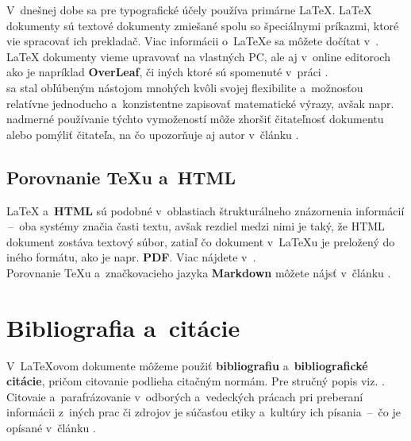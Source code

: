 \documentclass[a4paper, 11pt]{article}
\begin{document}
  \noindent V~dnešnej dobe sa pre typografické účely používa primárne {\LaTeX}. {\LaTeX} dokumenty sú textové dokumenty zmiešané spolu so špeciálnymi príkazmi, ktoré vie spracovať ich prekladač. Viac informácii o~{\LaTeX}e sa môžete dočítat v~\cite{rybicka2003latex}. {\LaTeX} dokumenty vieme upravovať na vlastných PC, ale aj v~online editoroch ako je napríklad \textbf{OverLeaf}, či iných ktoré sú spomenuté v~práci \cite{sokol2012onlinelatexeditor}.\\

  \noindent {\LaTeX} sa stal obľúbeným nástojom mnohých kvôli svojej flexibilite a~možnosťou relatívne jednoducho a~konzistentne zapisovať matematické výrazy, avšak napr. nadmerné používanie týchto vymožeností môže zhoršiť čitateľnosť dokumentu alebo pomýliť čitateľa, na čo upozorňuje aj autor v~článku \cite{hwang1995writing}.

  \subsection{Porovnanie TeXu a~HTML}

  {\LaTeX} a~\textbf{HTML} sú podobné v~oblastiach štrukturálneho znázornenia informácií \,--\, oba systémy značia časti textu, avšak rezdiel medzi nimi je taký, že HTML dokument zostáva textový súbor, zatiaľ čo dokument v~{\LaTeX}u je preložený do iného formátu, ako je napr. \textbf{PDF}. Viac nájdete v~\cite{goossens1999latex}.\\

  \noindent Porovnanie {\TeX}u a~značkovacieho jazyka \textbf{Markdown} môžete nájsť v~článku \cite{novotny2020tex}.

  \section{Bibliografia a~citácie}

  V~{\LaTeX}ovom dokumente môžeme použiť \textbf{bibliografiu} a~\textbf{bibliografické citácie}, pričom citovanie podlieha citačným normám. Pre stručný popis viz. \cite{mazac2010diplomka}. Citovaie a~parafrázovanie v~odborých a~vedeckých prácach pri preberaní informácii z~iných prac či zdrojov je súčasťou etiky a~kultúry ich písania \,--\, čo je opísané v~článku \cite{olsak2014tex}.

  \newpage

  
  \renewcommand{\refname}{Literatúra}
  
\end{document}
